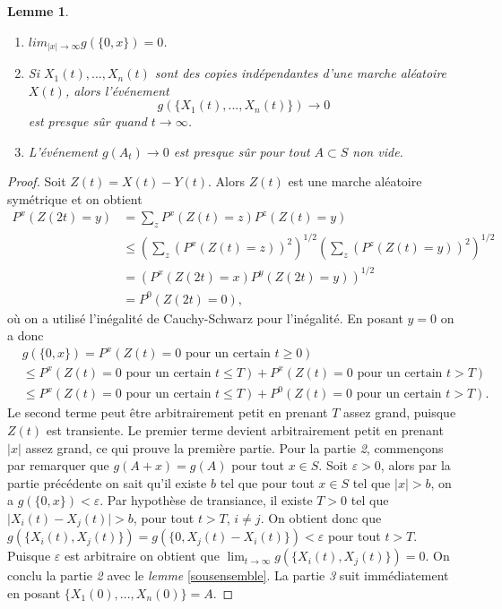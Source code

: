 \documentclass[a4paper,11pt]{article}
\theoremstyle{break}
\theoremstyle{break}
\newtheorem{lemma}[theorem]{Lemme}
\theoremstyle{definition}
\theoremstyle{remark}
\begin{document}
\begin{lemma}\label{g(0,x)}
\begin{enumerate}
\item $lim_{\vert x\vert \rightarrow\infty} g(\{0,x\})=0$.
\item Si $X_1 (t),...,X_n(t)$ sont des copies indépendantes d'une marche aléatoire $X(t)$, alors l'événement
$$
g(\{X_1 (t),...,X_n(t)\})\rightarrow 0
$$
est presque sûr quand $t\rightarrow\infty$.
\item L'événement $g(A_t)\rightarrow 0$ est presque sûr pour tout $A\subset S$ non vide.
\end{enumerate}
\end{lemma}
\begin{proof}
Soit $Z(t)=X(t)-Y(t)$. Alors $Z(t)$ est une marche aléatoire symétrique et on obtient
\begin{align*}
P^x(Z(2t)=y)&=\sum\limits_z P^x(Z(t)=z)P^z(Z(t)=y)\\
&\leq (\sum\limits_z (P^x(Z(t)=z))^2)^{1/2}(\sum\limits_z (P^z(Z(t)=y))^2)^{1/2}\\
&=(P^x(Z(2t)=x)P^y(Z(2t)=y))^{1/2}\\
&=P^0 (Z(2t)=0),
\end{align*}
où on a utilisé l'inégalité de Cauchy-Schwarz pour l'inégalité. En posant $y=0$ on a donc
\begin{align*}
&g(\{0,x\})=P^x(Z(t)=0 \text{ pour un certain }t\geq 0)\\
&\leq P^x(Z(t)=0 \text{ pour un certain }t\leq T) +P^x(Z(t)=0 \text{ pour un certain }t>T)\\
&\leq P^x(Z(t)=0 \text{ pour un certain }t\leq T) +P^0(Z(t)=0 \text{ pour un certain }t>T).
\end{align*}
Le second terme peut être arbitrairement petit en prenant $T$ assez grand, puisque $Z(t)$ est transiente. Le premier terme devient arbitrairement petit en prenant $\vert x \vert$ assez grand, ce qui prouve la première partie. 
Pour la partie \textit{2}, commençons par remarquer que $g(A+x)=g(A)$ pour tout $x\in S$. Soit $\varepsilon >0$, alors par la partie précédente on sait qu'il existe $b$ tel que pour tout $x\in S$ tel que $\vert x \vert > b$, on a $g(\{0,x\})<\varepsilon$. Par hypothèse de transiance, il existe $T>0$ tel que $\vert X_i(t)-X_j(t)\vert >b$, pour tout $t>T$, $i\neq j$. On obtient donc que $g(\{X_i(t), X_j(t)\})=g(\{0,X_j(t)- X_i(t)\})<\varepsilon$ pour tout $t>T$. Puisque $\varepsilon$ est arbitraire on obtient que $\lim_{t\rightarrow\infty}g(\{X_i(t), X_j(t)\}) = 0.$ On conclu la partie \textit{2} avec le \textit{lemme} \ref{sousensemble}.
La partie \textit{3} suit immédiatement en posant $\{X_1(0),...,X_n(0)\}=A$.
\end{proof}
\end{document}
